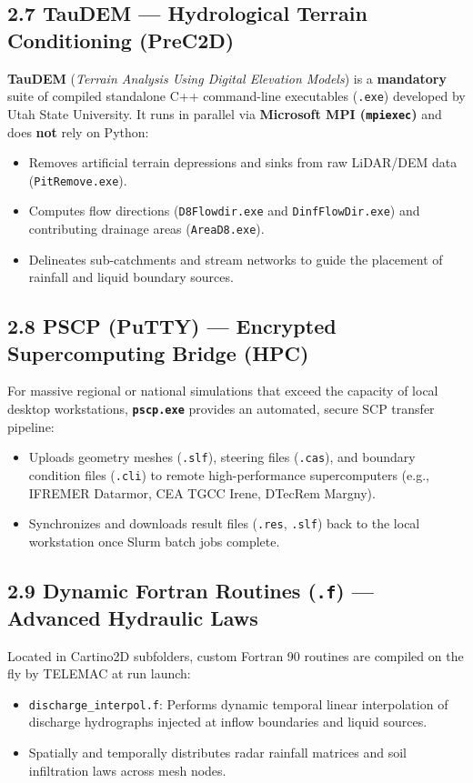\documentclass[10pt,a4paper]{article}
\begin{document}
\subsection*{2.7 TauDEM — Hydrological Terrain Conditioning (PreC2D)}
\textbf{TauDEM} (\textit{Terrain Analysis Using Digital Elevation Models}) is a \textbf{mandatory} suite of compiled standalone C++ command-line executables (\texttt{.exe}) developed by Utah State University. It runs in parallel via \textbf{Microsoft MPI (\texttt{mpiexec})} and does \textbf{not} rely on Python:
\begin{itemize}[leftmargin=1.5em, itemsep=2pt, topsep=2pt]
  \item Removes artificial terrain depressions and sinks from raw LiDAR/DEM data (\texttt{PitRemove.exe}).
  \item Computes flow directions (\texttt{D8Flowdir.exe} and \texttt{DinfFlowDir.exe}) and contributing drainage areas (\texttt{AreaD8.exe}).
  \item Delineates sub-catchments and stream networks to guide the placement of rainfall and liquid boundary sources.
\end{itemize}

\subsection*{2.8 PSCP (PuTTY) — Encrypted Supercomputing Bridge (HPC)}
For massive regional or national simulations that exceed the capacity of local desktop workstations, \textbf{\texttt{pscp.exe}} provides an automated, secure SCP transfer pipeline:
\begin{itemize}[leftmargin=1.5em, itemsep=2pt, topsep=2pt]
  \item Uploads geometry meshes (\texttt{.slf}), steering files (\texttt{.cas}), and boundary condition files (\texttt{.cli}) to remote high-performance supercomputers (e.g., IFREMER Datarmor, CEA TGCC Irene, DTecRem Margny).
  \item Synchronizes and downloads result files (\texttt{.res}, \texttt{.slf}) back to the local workstation once Slurm batch jobs complete.
\end{itemize}

\subsection*{2.9 Dynamic Fortran Routines (\texttt{.f}) — Advanced Hydraulic Laws}
Located in Cartino2D subfolders, custom Fortran 90 routines are compiled on the fly by TELEMAC at run launch:
\begin{itemize}[leftmargin=1.5em, itemsep=2pt, topsep=2pt]
  \item \texttt{discharge\_interpol.f}: Performs dynamic temporal linear interpolation of discharge hydrographs injected at inflow boundaries and liquid sources.
  \item Spatially and temporally distributes radar rainfall matrices and soil infiltration laws across mesh nodes.
\end{itemize}
\end{document}
